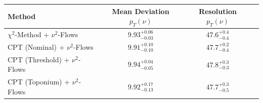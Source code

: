     \begin{tabular}{lccc}
        \toprule
        Method & Mean Deviation $p_{T}({\nu})$ & Resolution $p_{T}({\nu})$ \\
        \midrule
        $\chi^2$-Method + $\nu^2$-Flows & $9.93^{+0.06}_{-0.03}$ & $47.6^{+0.4}_{-0.4}$ \\
        CPT (Nominal) + $\nu^2$-Flows & $9.91^{+0.10}_{-0.10}$ & $47.7^{+0.2}_{-0.4}$ \\
        CPT (Threshold) + $\nu^2$-Flows & $9.94^{+0.04}_{-0.05}$ & $47.8^{+0.3}_{-0.3}$ \\
        CPT (Toponium) + $\nu^2$-Flows & $9.92^{+0.17}_{-0.13}$ & $47.7^{+0.3}_{-0.5}$ \\
        \bottomrule
    \end{tabular}